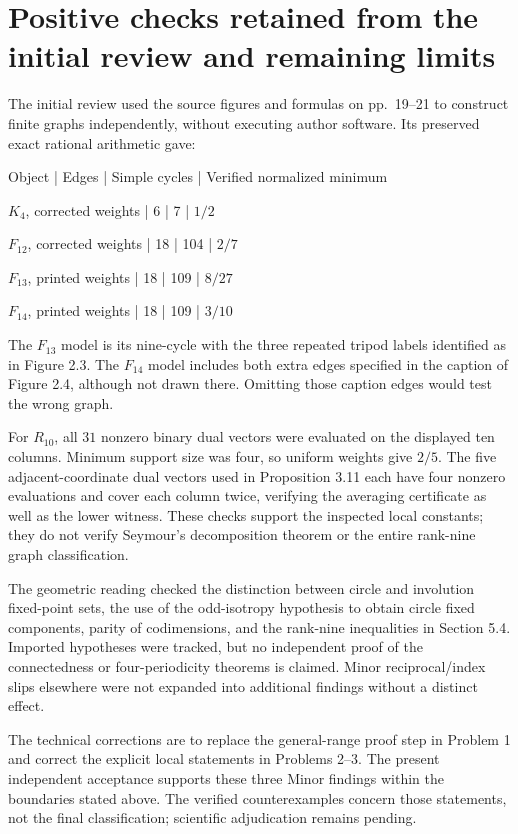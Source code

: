 \documentclass[10pt]{article}
\begin{document}
\section*{Positive checks retained from the initial review and remaining limits}
The initial review used the source figures and formulas on pp. 19–21 to construct finite graphs independently, without executing author software. Its preserved exact rational arithmetic gave:\par
Object | Edges | Simple cycles | Verified normalized minimum\par
\(K_4\), corrected weights | 6 | 7 | \(1/2\)\par
\(F_{12}\), corrected weights | 18 | 104 | \(2/7\)\par
\(F_{13}\), printed weights | 18 | 109 | \(8/27\)\par
\(F_{14}\), printed weights | 18 | 109 | \(3/10\)\par
The \(F_{13}\) model is its nine-cycle with the three repeated tripod labels identified as in Figure 2.3. The \(F_{14}\) model includes both extra edges specified in the caption of Figure 2.4, although not drawn there. Omitting those caption edges would test the wrong graph.\par
For \(R_{10}\), all \(31\) nonzero binary dual vectors were evaluated on the displayed ten columns. Minimum support size was four, so uniform weights give \(2/5\). The five adjacent-coordinate dual vectors used in Proposition 3.11 each have four nonzero evaluations and cover each column twice, verifying the averaging certificate as well as the lower witness. These checks support the inspected local constants; they do not verify Seymour’s decomposition theorem or the entire rank-nine graph classification.\par
The geometric reading checked the distinction between circle and involution fixed-point sets, the use of the odd-isotropy hypothesis to obtain circle fixed components, parity of codimensions, and the rank-nine inequalities in Section 5.4. Imported hypotheses were tracked, but no independent proof of the connectedness or four-periodicity theorems is claimed. Minor reciprocal/index slips elsewhere were not expanded into additional findings without a distinct effect.\par
The technical corrections are to replace the general-range proof step in Problem 1 and correct the explicit local statements in Problems 2–3. The present independent acceptance supports these three Minor findings within the boundaries stated above. The verified counterexamples concern those statements, not the final classification; scientific adjudication remains pending.\par
\end{document}
